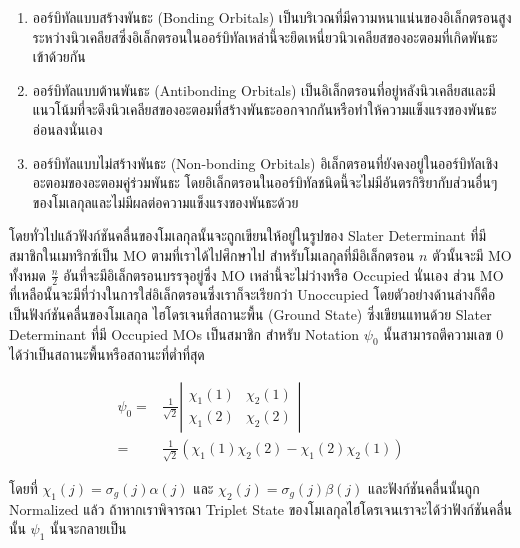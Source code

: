 \begin{enumerate}
    \item ออร์บิทัลแบบสร้างพันธะ (Bonding Orbitals) 
    เป็นบริเวณที่มีความหนาแน่นของอิเล็กตรอนสูงระหว่างนิวเคลียสซึ่งอิเล็กตรอนในออร์บิทัลเหล่านี้จะยึดเหนี่ยวนิวเคลียสของอะตอมที่เกิดพันธะเข้าด้วยกัน
    
    \item ออร์บิทัลแบบต้านพันธะ (Antibonding Orbitals) 
    เป็นอิเล็กตรอนที่อยู่หลังนิวเคลียสและมีแนวโน้มที่จะดึงนิวเคลียสของอะตอมที่สร้างพันธะออกจากกันหรือทำให้ความแข็งแรงของพันธะอ่อนลงนั่นเอง
    
    \item ออร์บิทัลแบบไม่สร้างพันธะ (Non-bonding Orbitals) 
    อิเล็กตรอนที่ยังคงอยู่ในออร์บิทัลเชิงอะตอมของอะตอมคู่ร่วมพันธะ โดยอิเล็กตรอนในออร์บิทัลชนิดนี้จะไม่มีอันตรกิริยากับส่วนอื่นๆของโมเลกุลและไม่มีผลต่อความแข็งแรงของพันธะด้วย
\end{enumerate}

โดยทั่วไปแล้วฟังก์ชันคลื่นของโมเลกุลนั้นจะถูกเขียนให้อยู่ในรูปของ Slater Determinant ที่มีสมาชิกในเมทริกซ์เป็น MO ตามที่เราได้ไปศึกษาไป
สำหรับโมเลกุลที่มีอิเล็กตรอน $n$ ตัวนั้นจะมี MO ทั้งหมด $\frac{n}{2}$ อันที่จะมีอิเล็กตรอนบรรจุอยู่ซึ่ง MO เหล่านี้จะไม่ว่างหรือ Occupied 
นั่นเอง ส่วน MO ที่เหลือนั้นจะมีที่ว่างในการใส่อิเล็กตรอนซึ่งเราก็จะเรียกว่า Unoccupied โดยตัวอย่างด้านล่างก็คือเป็นฟังก์ชันคลื่นของโมเลกุล%
ไฮโดรเจนที่สถานะพื้น (Ground State) ซึ่งเขียนแทนด้วย Slater Determinant ที่มี Occupied MOs เป็นสมาชิก สำหรับ Notation 
$\psi_0$ นั้นสามารถตีความเลข 0 ได้ว่าเป็นสถานะพื้นหรือสถานะที่ต่ำที่สุด

\begin{equation}
    \begin{aligned}
        \psi_0 
        = & 
        \frac{1}{\sqrt{2}}
        \left|
            \begin{array}{ll}
                \chi_1(1) & \chi_2(1) \\
                \chi_1(2) & \chi_2(2)
            \end{array}
        \right| \\
        = &
        \frac{1}{\sqrt{2}}
        \left(
            \chi_1(1) \chi_2(2) - \chi_1(2) \chi_2(1)
        \right)
    \end{aligned}
\end{equation}

\noindent โดยที่ $\chi_1(j) = \sigma_g(j) \alpha(j)$ และ $\chi_2(j) = \sigma_g(j) \beta(j)$ และฟังก์ชันคลื่นนั้นถูก 
Normalized แล้ว ถ้าหากเราพิจารณา Triplet State ของโมเลกุลไฮโดรเจนเราจะได้ว่าฟังก์ชันคลื่นนั้น $\psi_1$ นั้นจะกลายเป็น

